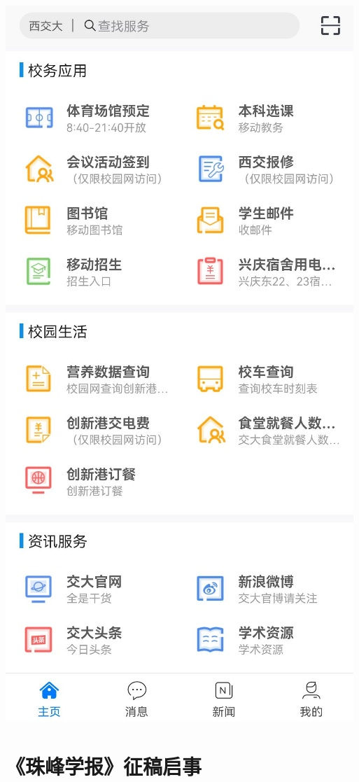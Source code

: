 \documentclass[
decoration,  %
]{qyxf-book}
\begin{document}
\begin{minipage}[b]{0.4\linewidth}
	\includegraphics[width=8\baselineskip]{pics/app02.png}
\end{minipage} 


\newpage
\section{《珠峰学报》征稿启事}
\end{document}
